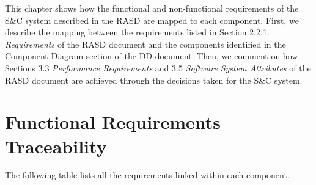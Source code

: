 This chapter shows how the functional and non-functional requirements of the S\&C system described in the RASD are mapped to each component.
First, we describe the mapping between the requirements listed in Section 2.2.1. \textit{Requirements} of the RASD document
and the components identified in the Component Diagram section of the DD document.
Then, we comment on how Sections 3.3 \textit{Performance Requirements} and 3.5 \textit{Software System Attributes} of the RASD document are achieved through the decisions taken for the S\&C system.

\section{Functional Requirements Traceability}
\label{sec: functional_requirements_traceability}
The following table lists all the requirements linked within each component.

